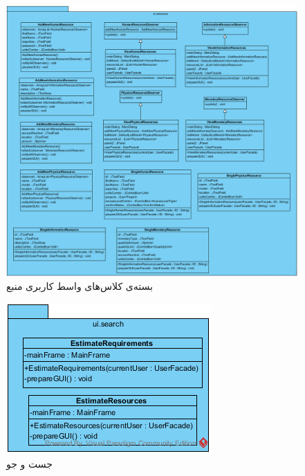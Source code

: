 \begin{figure}[H]
	\centering
	\includegraphics[width=\textwidth]{img/class-design/ui/UIResource}

	\caption{بسته‌ی کلاس‌های واسط کاربری منبع}
\end{figure}

\begin{figure}[H]
	\centering
	\includegraphics[width=\textwidth]{img/class-design/ui/UISearch}

	\caption{جست و جو}
\end{figure}

